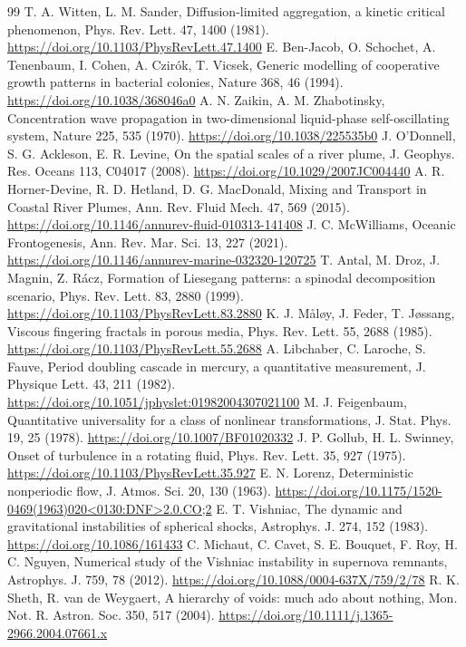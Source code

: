 \documentclass[11pt]{article}
\begin{document}
\begin{thebibliography}{99}
 T. A. Witten, L. M. Sander, Diffusion-limited aggregation, a kinetic critical phenomenon, Phys. Rev. Lett. 47, 1400 (1981). \url{https://doi.org/10.1103/PhysRevLett.47.1400}
 E. Ben-Jacob, O. Schochet, A. Tenenbaum, I. Cohen, A. Czirók, T. Vicsek, Generic modelling of cooperative growth patterns in bacterial colonies, Nature 368, 46 (1994). \url{https://doi.org/10.1038/368046a0}
 A. N. Zaikin, A. M. Zhabotinsky, Concentration wave propagation in two-dimensional liquid-phase self-oscillating system, Nature 225, 535 (1970). \url{https://doi.org/10.1038/225535b0}
 J. O'Donnell, S. G. Ackleson, E. R. Levine, On the spatial scales of a river plume, J. Geophys. Res. Oceans 113, C04017 (2008). \url{https://doi.org/10.1029/2007JC004440}
 A. R. Horner-Devine, R. D. Hetland, D. G. MacDonald, Mixing and Transport in Coastal River Plumes, Ann. Rev. Fluid Mech. 47, 569 (2015). \url{https://doi.org/10.1146/annurev-fluid-010313-141408}
 J. C. McWilliams, Oceanic Frontogenesis, Ann. Rev. Mar. Sci. 13, 227 (2021). \url{https://doi.org/10.1146/annurev-marine-032320-120725}
 T. Antal, M. Droz, J. Magnin, Z. Rácz, Formation of Liesegang patterns: a spinodal decomposition scenario, Phys. Rev. Lett. 83, 2880 (1999). \url{https://doi.org/10.1103/PhysRevLett.83.2880}
 K. J. Måløy, J. Feder, T. Jøssang, Viscous fingering fractals in porous media, Phys. Rev. Lett. 55, 2688 (1985). \url{https://doi.org/10.1103/PhysRevLett.55.2688}
 A. Libchaber, C. Laroche, S. Fauve, Period doubling cascade in mercury, a quantitative measurement, J. Physique Lett. 43, 211 (1982). \url{https://doi.org/10.1051/jphyslet:01982004307021100}
 M. J. Feigenbaum, Quantitative universality for a class of nonlinear transformations, J. Stat. Phys. 19, 25 (1978). \url{https://doi.org/10.1007/BF01020332}
 J. P. Gollub, H. L. Swinney, Onset of turbulence in a rotating fluid, Phys. Rev. Lett. 35, 927 (1975). \url{https://doi.org/10.1103/PhysRevLett.35.927}
 E. N. Lorenz, Deterministic nonperiodic flow, J. Atmos. Sci. 20, 130 (1963). \url{https://doi.org/10.1175/1520-0469(1963)020<0130:DNF>2.0.CO;2}
 E. T. Vishniac, The dynamic and gravitational instabilities of spherical shocks, Astrophys. J. 274, 152 (1983). \url{https://doi.org/10.1086/161433}
 C. Michaut, C. Cavet, S. E. Bouquet, F. Roy, H. C. Nguyen, Numerical study of the Vishniac instability in supernova remnants, Astrophys. J. 759, 78 (2012). \url{https://doi.org/10.1088/0004-637X/759/2/78}
 R. K. Sheth, R. van de Weygaert, A hierarchy of voids: much ado about nothing, Mon. Not. R. Astron. Soc. 350, 517 (2004). \url{https://doi.org/10.1111/j.1365-2966.2004.07661.x}
\end{thebibliography}
\endgroup
\end{document}
